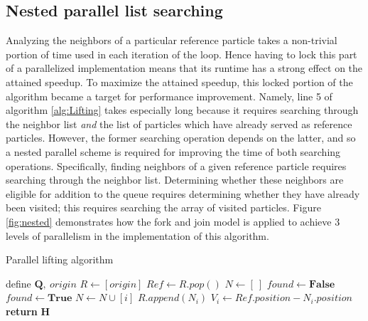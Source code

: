 \documentclass{article}
\begin{document}
\subsection{Nested parallel list searching}
Analyzing the neighbors of a particular reference particle takes a non-trivial  portion of time used in each iteration of the loop. Hence having to lock this part of a parallelized implementation means that its runtime has a strong effect on the attained speedup. To maximize the attained speedup, this locked portion of the algorithm became a target for performance improvement. Namely, line 5 of algorithm \ref{alg:Lifting} takes especially long because it requires searching through the neighbor list \textit{and} the list of particles which have already served as reference particles. However, the former searching operation depends on the latter, and so a nested parallel scheme is required for improving the time of both searching operations. Specifically, finding neighbors of a given reference particle requires searching through the neighbor list. Determining whether these neighbors are eligible for addition to the queue requires determining whether they have already been visited; this requires searching the array of visited particles. Figure \ref{fig:nested} demonstrates how the fork and join model is applied to achieve 3 levels of parallelism in the implementation of this algorithm.

\begin{algorithm}[htp!]
    \caption{Parallel lifting algorithm}\label{alg:ParallelLifting}
    \begin{algorithmic}[1]
    \State define $\mathbf{Q},\ origin$
    \State $R \gets [origin]$
        \State $Ref \gets R.pop()$
        \State $N \gets [\ ]$
                \State $found \gets \textbf{False}$
                        \State $found \gets \textbf{True}$
                    \EndIf
                \EndFor
            \EndIf
                \State $N \gets N \cup [i]$
            \EndIf
        \EndFor
            \State $R.append(N_i)$ 
            \State $V_i \gets Ref.position - N_i.position$
        \EndFor
    \EndWhile
    \State \textbf{return} $\mathbf{H}$
    \end{algorithmic}
\end{algorithm}
\end{document}
